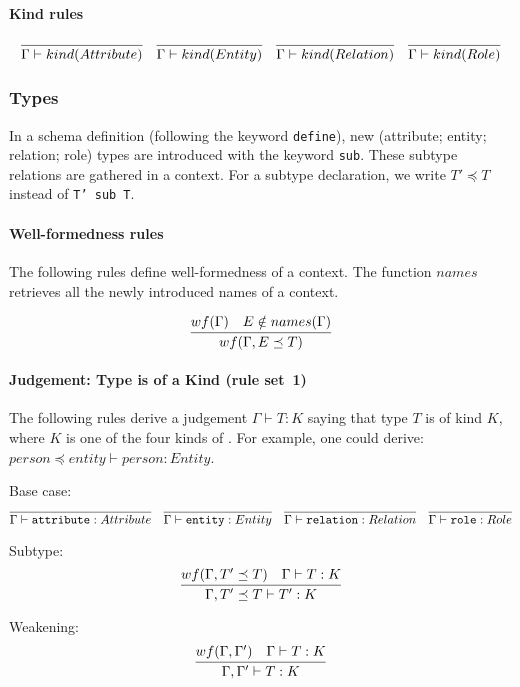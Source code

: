 \documentclass[runningheads]{llncs}
\begin{document}
\paragraph{Kind rules}


$$
\infer{\Gamma \vdash kind(Attribute)}{}
\quad
\infer{\Gamma \vdash kind(Entity)}{}
\quad
\infer{\Gamma \vdash kind(Relation)}{}
\quad
\infer{\Gamma \vdash kind(Role)}{}
$$



\subsubsection{Types}\label{sec:structure_types}

In a schema definition (following the keyword \texttt{define}), new
(attribute; entity; relation; role) types are introduced with the keyword
\texttt{sub}. These subtype relations are gathered in a context. For a subtype
declaration, we write $T' \preceq T$ instead of \texttt{T' sub T}.

\paragraph{Well-formedness rules} The following rules define well-formedness
of a context. The function $names$ retrieves all the newly introduced names of
a context.

$$
  \infer{wf(\Gamma, E \preceq T)}{
  wf(\Gamma) & E \notin names(\Gamma)
}
$$


\paragraph{Judgement: Type is of a Kind (rule set~1)}
The following rules derive a judgement $\Gamma \vdash T: K$ saying that type
$T$ is of kind $K$, where $K$ is one of the four kinds of
. For example, one could derive: 
$person \preceq entity \vdash person: Entity$.

Base case:
$$
\infer{\Gamma \vdash \mathtt{attribute} : Attribute}{}
\quad
\infer{\Gamma \vdash \mathtt{entity} : Entity}{}
\quad
\infer{\Gamma \vdash \mathtt{relation} : Relation}{}
\quad
\infer{\Gamma \vdash \mathtt{role} : Role}{}
$$

Subtype:
$$
\infer{\Gamma, T' \preceq T \vdash T' : K}{
  wf(\Gamma, T' \preceq T) & \Gamma \vdash T : K 
}
$$

Weakening:
$$
\infer{\Gamma, \Gamma' \vdash T : K}{
  wf(\Gamma, \Gamma')
  & 
  \Gamma \vdash T : K
}
$$
\end{document}
